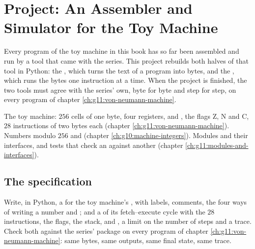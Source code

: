\chapter{Project: An Assembler and Simulator for the Toy Machine}\label{ch:g11:project-toy-machine}

Every program of the toy machine in this book has so far been assembled and run by a tool that came with the series.
This project rebuilds both halves of that tool in Python: the , which turns the text of a program into
bytes, and the , which runs the bytes one instruction at a time. When the project is finished, the two
tools must agree with the series' own, byte for byte and step for step, on every program of chapter
\ref{ch:g11:von-neumann-machine}.

\begin{recall}
The toy machine: $256$ cells of one byte, four registers,  and , the flags Z, N and C, $28$
instructions of two bytes each (chapter \ref{ch:g11:von-neumann-machine}). Numbers modulo $256$ and 
(chapter \ref{ch:g10:machine-integers}). Modules and their interfaces, and tests that check an  against
another (chapter \ref{ch:g11:modules-and-interfaces}).
\end{recall}

\section{The specification}\label{sec:g11:project-toy-machine:spec}

Write, in Python, a  for the toy machine's , with labels, comments, the four ways
of writing a number and ; and a  of its fetch--execute cycle with the $28$ instructions, the flags,
the stack,  and , a limit on the number of steps and a trace. Check both against the series'
package  on every program of chapter \ref{ch:g11:von-neumann-machine}: same bytes, same outputs, same
final state, same trace.

